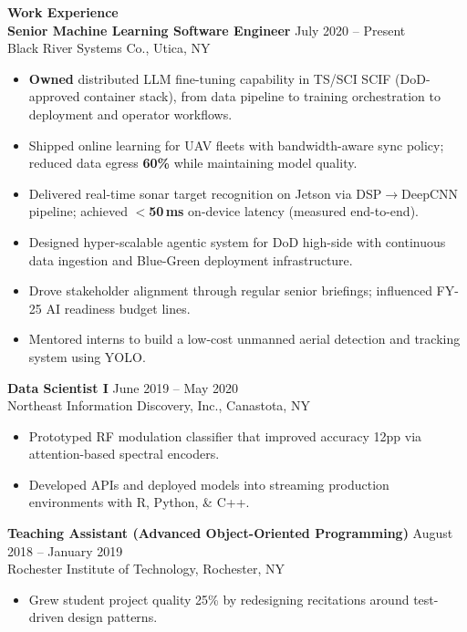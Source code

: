 \documentclass[10.5pt]{res}
\begin{document}
\begin{resume}
{\bf Work Experience} \vspace{0.27 cm} \\
{\bf Senior Machine Learning Software Engineer} \hfill July 2020 -- Present\\
Black River Systems Co., Utica, NY \\
\begin{itemize}\rightmargin=0cm \itemsep 2pt
    \item \textbf{Owned} distributed LLM fine-tuning capability in TS/SCI SCIF (DoD-approved container stack), from data pipeline to training orchestration to deployment and operator workflows.
    \item Shipped online learning for UAV fleets with bandwidth-aware sync policy; reduced data egress \textbf{60\%} while maintaining model quality.
    \item Delivered real-time sonar target recognition on Jetson via DSP$\rightarrow$DeepCNN pipeline; achieved \textbf{$<$50\,ms} on-device latency (measured end-to-end).
    \item Designed hyper-scalable agentic system for DoD high-side with continuous data ingestion and Blue-Green deployment infrastructure.
    \item Drove stakeholder alignment through regular senior briefings; influenced FY-25 AI readiness budget lines.
    \item Mentored interns to build a low-cost unmanned aerial detection and tracking system using YOLO.
\end{itemize}

{\bf Data Scientist I} \hfill June 2019 -- May 2020\\
Northeast Information Discovery, Inc., Canastota, NY \\
\begin{itemize}\rightmargin=0cm \itemsep 2pt
    \item Prototyped RF modulation classifier that improved accuracy 12pp via attention-based spectral encoders.
    \item Developed APIs and deployed models into streaming production environments with R, Python, \& C++.
\end{itemize}

{\bf Teaching Assistant (Advanced Object-Oriented Programming)} \hfill August 2018 -- January 2019\\
Rochester Institute of Technology, Rochester, NY \\
\begin{itemize}\rightmargin=0cm \itemsep 2pt
    \item Grew student project quality 25\% by redesigning recitations around test-driven design patterns.
\end{itemize}


\end{resume}
\end{document}
